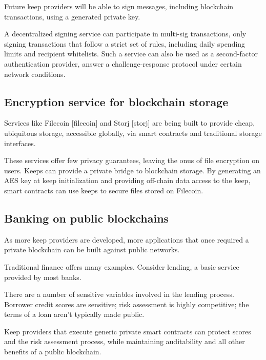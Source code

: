 \documentclass[11pt]{article}
\begin{document}
Future keep providers will be able to sign messages, including
blockchain transactions, using a generated private key.

A decentralized signing service can participate in multi-sig
transactions, only signing transactions that follow a strict set of
rules, including daily spending limits and recipient whitelists. Such
a service can also be used as a second-factor authentication provider,
answer a challenge-response protocol under certain network conditions.

\subsection{Encryption service for blockchain storage}

Services like Filecoin [filecoin] and Storj [storj] are being built to
provide cheap, ubiquitous storage, accessible globally, via smart
contracts and traditional storage interfaces.

These services offer few privacy guarantees, leaving the onus of file
encryption on users. Keeps can provide a private bridge to blockchain
storage. By generating an AES key at keep initialization and providing
off-chain data access to the keep, smart contracts can use keeps to
secure files stored on Filecoin.

\subsection{Banking on public blockchains}

As more keep providers are developed, more applications that once
required a private blockchain can be built against public networks.

Traditional finance offers many examples. Consider lending, a basic
service provided by most banks.

There are a number of sensitive variables involved in the lending
process. Borrower credit scores are sensitive; risk assessment is
highly competitive; the terms of a loan aren’t typically made public.

Keep providers that execute generic private smart contracts can
protect scores and the risk assessment process, while maintaining
auditability and all other benefits of a public blockchain.
\end{document}
